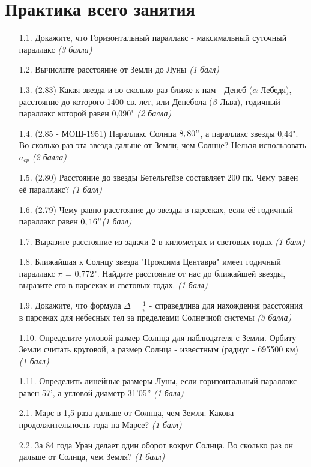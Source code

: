 \documentclass[16pt,a4paper]{report}
\begin{document}
\section{Практика всего занятия}
\begin{enumerate}
    \item [1.1.] Докажите, что Горизонтальный параллакс - максимальный суточный параллакс \emph{(3 балла)}
    \item [1.2.] Вычислите расстояние от Земли до Луны \emph{(1 балл)}
    \item [1.3.] (2.83) Какая звезда и во сколько раз ближе к нам - Денеб ($\alpha$ Лебедя), расстояние до которого 1400 св. лет, или Денебола ($\beta$ Льва), годичный параллакс которой равен 0,090" \emph{(2 балла)}
    \item [1.4.] (2.85 - МОШ-1951) Параллакс Солнца $8,80"$, а параллакс звезды 0,44". Во сколько раз эта звезда дальше от Земли, чем Солнце? Нельзя использовать $a_{cp}$ \emph{(2 балла)}
    \item [1.5.] (2.80) Расстояние до звезды Бетельгейзе составляет 200 пк. Чему равен её параллакс? \emph{(1 балл)}
    \item [1.6.] (2.79) Чему равно расстояние до звезды в парсеках, если её годичный параллакс равен $0,16"$\emph{(1 балл)}
    \item [1.7.] Выразите расстояние из задачи 2 в километрах и световых годах \emph{(1 балл)}
    \item [1.8.] Ближайшая к Солнцу звезда "Проксима Центавра" имеет годичный параллакс $\pi$ = 0,772". Найдите расстояние от нас до ближайшей звезды, выразите его в парсеках и световых годах. \emph{(1 балл)}
    \item [1.9.] Докажите, что формула $\Delta = \frac{1}{\pi }$ - справедлива для нахождения расстояния в парсеках для небесных тел за пределеами Солнечной системы \emph{(3 балла)}
    \item [1.10.] Определите угловой размер Солнца для наблюдателя с Земли. Орбиту Земли считать круговой, а размер Солнца - известным (радиус - 695500 км) \emph{(1 балл)}
    \item [1.11.] Определить линейные размеры Луны, если горизонтальный параллакс равен 57', а угловой диаметр 31'05'' \emph{(1 балл)}
    \item [2.1.] Марс в 1,5 раза дальше от Солнца, чем Земля. Какова продолжительность года на Марсе? \emph{(1 балл)}
    \item [2.2.]За 84 года Уран делает один оборот вокруг Солнца. Во сколько раз он дальше от Солнца, чем Земля? \emph{(1 балл)}

\end{enumerate}
\end{document}
